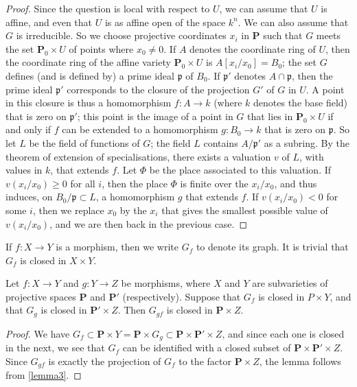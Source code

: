 \documentclass{article}
\theoremstyle{plain}
\newenvironment{lemma}[1]
    {\renewcommand\theinnercustomlemma{#1}\innercustomlemma}
    {\endinnercustomlemma}
\theoremstyle{definition}
\newcommand{\PP}{\mathbf{P}}
\renewcommand{\geq}{\geqslant}
\newcommand{\oldpage}[1]{\marginpar{\footnotesize$\Big\vert$ \textit{p.~#1}}}
\begin{document}
\begin{proof}
  Since the question is local with respect to $U$, we can assume that $U$ is affine, and even that $U$ is as affine open of the space $k^n$.
  We can also assume that $G$ is irreducible.
  So we choose projective coordinates $x_i$ in $\PP$ such that $G$ meets the set $\PP_0\times U$ of points where $x_0\neq0$.
  If $A$ denotes the coordinate ring of $U$, then the coordinate ring of the affine variety $\PP_0\times U$ is $A[x_i/x_0]=B_0$;
  the set $G$ defines (and is defined by) a prime ideal $\mathfrak{p}$ of $B_0$.
  If $\mathfrak{p}'$ denotes $A\cap\mathfrak{p}$, then the prime ideal $\mathfrak{p}'$ corresponds to the closure of the projection $G'$ of $G$ in $U$.
  A point in this closure is thus a homomorphism $f\colon A\to k$ (where $k$ denotes the base field) that is zero on $\mathfrak{p}'$;
\oldpage{100}
  this point is the image of a point in $G$ that lies in $\PP_0\times U$ if and only if $f$ can be extended to a homomorphism $g\colon B_0\to k$ that is zero on $\mathfrak{p}$.
  So let $L$ be the field of functions of $G$;
  the field $L$ contains $A/\mathfrak{p}'$ as a subring.
  By the theorem of extension of specialisations, there exists a valuation $v$ of $L$, with values in $k$, that extends $f$.
  Let $\Phi$ be the place associated to this valuation.
  If $v(x_i/x_0)\geq0$ for all $i$, then the place $\Phi$ is finite over the $x_i/x_0$, and thus induces, on $B_0/\mathfrak{p}\subset L$, a homomorphism $g$ that extends $f$.
  If $v(x_i/x_0)<0$ for some $i$, then we replace $x_0$ by the $x_i$ that gives the smallest possible value of $v(x_i/x_0)$, and we are then back in the previous case.
\end{proof}

If $f\colon X\to Y$ is a morphism, then we write $G_f$ to denote its graph.
It is trivial that $G_f$ is closed in $X\times Y$.

\begin{lemma}{4}
\label{lemma4}
  Let $f\colon X\to Y$ and $g\colon Y\to Z$ be morphisms, where $X$ and $Y$ are subvarieties of projective spaces $\PP$ and $\PP'$ (respectively).
  Suppose that $G_f$ is closed in $P\times Y$, and that $G_g$ is closed in $\PP'\times Z$.
  Then $G_{gf}$ is closed in $\PP\times Z$.
\end{lemma}

\begin{proof}
  We have $G_f \subset \PP\times Y = \PP\times G_g \subset \PP\times \PP'\times Z$, and since each one is closed in the next, we see that $G_f$ can be identified with a closed subset of $\PP\times \PP'\times Z$.
  Since $G_{gf}$ is exactly the projection of $G_f$ to the factor $\PP\times Z$, the lemma follows from \cref{lemma3}.
\end{proof}
\end{document}
